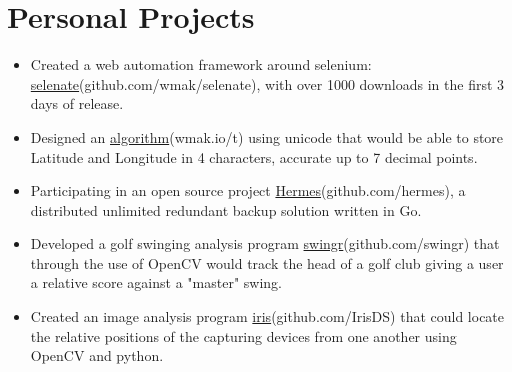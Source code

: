 \documentclass[a4paper, 10pt]{article}
\newcommand{\uhref}[2]{\href{#1}{\color{gray}#2}}
\begin{document}
\section{\bf{Personal Projects}}
\begin{itemize}
	\setlength\itemsep{0.1em}
	\item Created a web automation framework around selenium:
		\uhref{https://github.com/wmak/selenate}{selenate}(github.com/wmak/selenate),
		with over 1000 downloads in the first 3 days of release.
	\item Designed an \uhref{http://wmak.io/t.html}{algorithm}(wmak.io/t) using
		unicode that would be able to store Latitude and Longitude in 4
		characters, accurate up to 7 decimal points.  
	\item Participating in an open source project
		\uhref{https://github.com/hermes}{Hermes}(github.com/hermes), a
		distributed unlimited redundant backup solution written in Go.  
	\item Developed a golf swinging analysis program
		\uhref{http://github.com/swingr/}{swingr}(github.com/swingr) that through
		the use of OpenCV would track the head of a golf club giving a user a
		relative score against a "master" swing.
	\item Created an image analysis program
		\uhref{https://github.com/IrisDS}{iris}(github.com/IrisDS)
		that could locate the relative positions of the capturing devices from
		one another using OpenCV and python.
\end{itemize}
\end{document}
